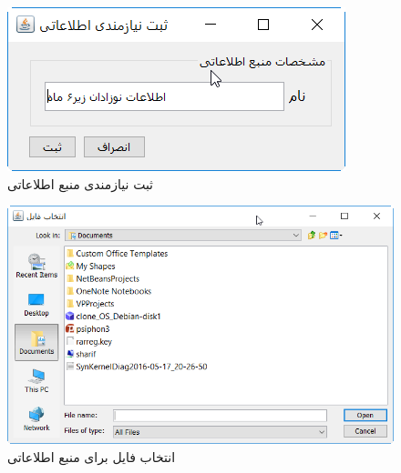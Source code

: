 \begin{figure}[H]
	\centering
	\includegraphics[scale=0.8]{img/prot/AddNewInformationRequirement}
	\caption{ثبت نیازمندی منبع اطلاعاتی }
\end{figure}
\begin{figure}[H]
	\centering
	\includegraphics[scale=0.8]{img/prot/FileChooserWindow}
	\caption{انتخاب فایل برای منبع اطلاعاتی}
\end{figure}

